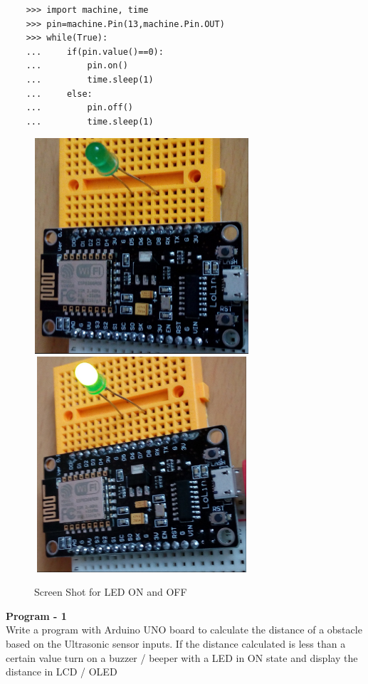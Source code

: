\documentclass[12pt,a4paper]{article}
\begin{document}
\begin{lstlisting}
    >>> import machine, time
    >>> pin=machine.Pin(13,machine.Pin.OUT)
    >>> while(True):
    ...     if(pin.value()==0):
    ...         pin.on()
    ...         time.sleep(1)
    ...     else:
    ...         pin.off()
    ...         time.sleep(1)
\end{lstlisting}
\begin{figure}[h!]
\centerline{%
\includegraphics[width=8cm,height=8cm]{Introduction/20a.jpg}
\vspace{0.5mm}
\includegraphics[width=8cm,height=8cm]{Introduction/20b.jpg}
}%
\caption{Screen Shot for LED ON and OFF}
\end{figure}
\clearpage %
\begin{center}
\large {\textbf{Program - 1}}\\
Write a program with Arduino UNO board to calculate the distance of a obstacle based on the
Ultrasonic sensor inputs. If the distance calculated is less than a certain value turn on a buzzer / beeper with a LED in ON state and display the distance in LCD / OLED
\end{center}
\end{document}
